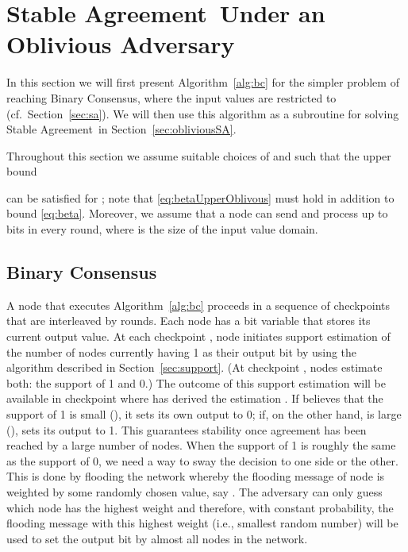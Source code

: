 \documentclass[leqno,11pt]{article}
\newcommand{\sa}{{\sc Stable Agreement}}
\newcommand{\bc}{{\sc Binary Consensus}}
\begin{document}
\section{\sa\ Under an Oblivious Adversary} \label{sec:oblivious}

In this section we will first present Algorithm~\ref{alg:bc} for the simpler
problem of reaching \bc, where the input values are restricted to 
(cf.\ Section~\ref{sec:sa}). We will then use this algorithm as a subroutine
for solving \sa\ in Section~\ref{sec:obliviousSA}.

Throughout this section we assume suitable choices of  and  such
that the upper bound 

can be satisfied for ; note that \eqref{eq:betaUpperOblivous} must hold
in addition to bound \eqref{eq:beta}.
Moreover, we assume that a node can send and process up to
 bits in every round, where  is the size of the input value
domain.  

\subsection{\bc} \label{sec:obliviousBC}

A node  that executes Algorithm~\ref{alg:bc} proceeds in a sequence of
 checkpoints that are interleaved by  rounds. Each node  has a bit variable  that stores its current output value. At each
checkpoint , node  initiates support estimation of the number of nodes
currently having 1 as their output bit by using the algorithm described in
Section~\ref{sec:support}. (At checkpoint , nodes estimate both:
the support of 1 and 0.) 
The outcome of this support estimation will be
available in checkpoint  where  has derived the estimation .
If  believes that the support of 1 is small (), it
sets its own output  to 0; if, on the other hand,  is large (),  sets its output  to 1. This guarantees stability once
agreement has been reached by a large number of nodes. When the support of 1 is
roughly the same as the support of 0, we need a way to sway the decision to one
side or the other. This is done by flooding the network whereby the flooding
message of node  is weighted by some randomly chosen value, say . The adversary can only
guess which node has the highest weight and therefore, with constant
probability, the flooding message with this highest weight (i.e., smallest
random number) will be used to set the output bit by almost all nodes in the
network. 
\end{document}
